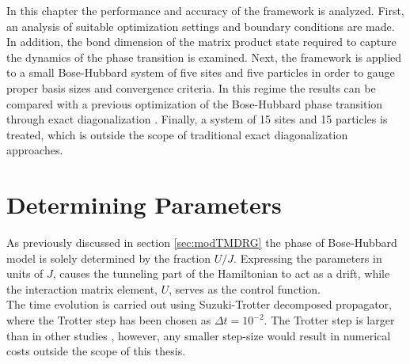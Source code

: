 In this chapter the performance and accuracy of the framework is analyzed. First, an analysis of suitable optimization settings and boundary conditions are made. In addition, the bond dimension of the matrix product state required to capture the dynamics of the phase transition is examined. Next, the framework is applied to a small Bose-Hubbard system of five sites and five particles in order to gauge proper basis sizes and convergence criteria. In this regime the results can be compared with a previous optimization of the Bose-Hubbard phase transition through exact diagonalization \cite{MajaJulie}. Finally, a system of 15 sites and 15 particles is treated, which is outside the scope of traditional exact diagonalization approaches.   




\section{Determining Parameters}

As previously discussed in section \ref{sec:modTMDRG} the phase of Bose-Hubbard model is solely determined by the fraction $U/J$. Expressing the parameters in units of $J$, causes the tunneling part of the Hamiltonian to act as a drift, while the interaction matrix element, $U$, serves as the control function.\\
The time evolution is carried out using Suzuki-Trotter decomposed propagator, where the Trotter step has been chosen as $\Delta t = 10^{-2}$. The Trotter step is larger than in other studies \cite{Doria2011,FrankBloch,Braun2015}, however, any smaller step-size would result in numerical costs outside the scope of this thesis.



